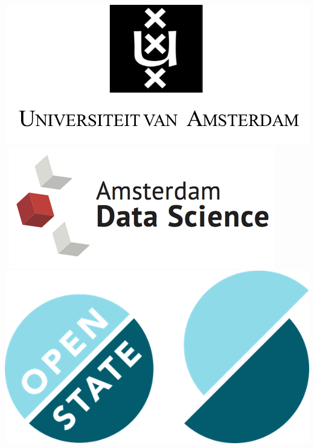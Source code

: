 \begin{titlepage}
\begin{center}
\mbox{\includegraphics[width=.2\paperwidth]{TitlePages/logos/logo-uva.png} 
\includegraphics[width=.2\paperwidth]{TitlePages/logos/ads.png}
\includegraphics[width=.2\paperwidth]{TitlePages/logos/osf.png} %
}
\end{center}
\end{titlepage}

